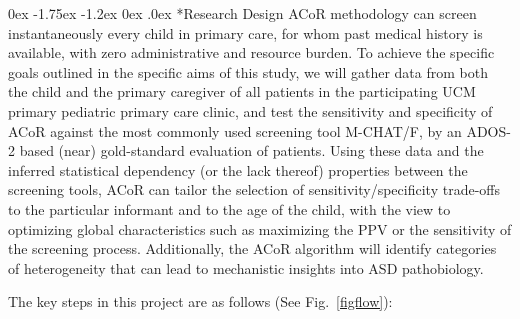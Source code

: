 \documentclass[onecolumn, compsoc,11pt]{IEEEtran}
\makeatletter
\renewcommand\subsection{\@startsection {subsection}{2}{\z@}%
                                   {0ex \@plus -1.75ex \@minus -1.2ex}%
                                   {0ex \@plus.0ex}%
                                   {\fontsize{11}{11}\selectfont\bfseries\sffamily\color{black}}}
\def\ZERO{ACoR\xspace}
\makeatother
\begin{document}
\subsection*{Research Design} %
\ZERO methodology can  screen instantaneously   every child  in primary care, for whom past medical history is available, with zero administrative and resource burden. To achieve the specific goals outlined in the specific aims of this study, we will gather data from both the child and the primary caregiver of all patients in the participating UCM primary pediatric primary care clinic, and test the sensitivity and specificity of \ZERO against the most commonly used screening tool M-CHAT/F, by an ADOS-2 based  (near) gold-standard evaluation of   patients. Using these data and the inferred statistical dependency (or the lack thereof) properties between the screening tools, \ZERO  can tailor the selection of sensitivity/specificity trade-offs  to the particular informant and to the age of the child, with the view to optimizing global characteristics such as maximizing the PPV or the sensitivity of the screening process. Additionally, the \ZERO algorithm will identify categories of heterogeneity that can lead to mechanistic insights into ASD pathobiology.


The key steps in this project are as  follows (See Fig.~\ref{figflow}):
\end{document}
